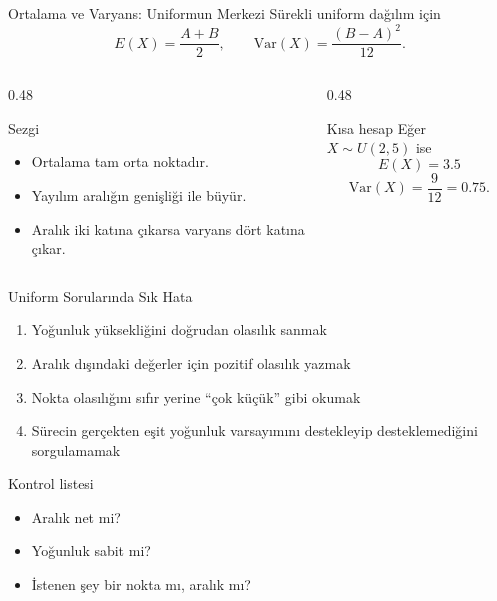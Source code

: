 \documentclass[light]{lutbeamer}
\begin{document}
\begin{frame}{Ortalama ve Varyans: Uniformun Merkezi}
    \small
    Sürekli uniform dağılım için
    \[
    E(X)=\frac{A+B}{2}, \qquad \mathrm{Var}(X)=\frac{(B-A)^2}{12}.
    \]

    \begin{columns}[T]
        \begin{column}{0.48\textwidth}
            \begin{block}{Sezgi}
                \begin{itemize}
                    \item Ortalama tam orta noktadır.
                    \item Yayılım aralığın genişliği ile büyür.
                    \item Aralık iki katına çıkarsa varyans dört katına çıkar.
                \end{itemize}
            \end{block}
        \end{column}
        \begin{column}{0.48\textwidth}
            \begin{exampleblock}{Kısa hesap}
                Eğer \(X \sim U(2,5)\) ise
                \[
                E(X)=3.5
                \]
                \[
                \mathrm{Var}(X)=\frac{9}{12}=0.75.
                \]
            \end{exampleblock}
        \end{column}
    \end{columns}
\end{frame}

\begin{frame}{Uniform Sorularında Sık Hata}
    \small
    \begin{enumerate}
        \item Yoğunluk yüksekliğini doğrudan olasılık sanmak
        \item Aralık dışındaki değerler için pozitif olasılık yazmak
        \item Nokta olasılığını sıfır yerine ``çok küçük'' gibi okumak
        \item Sürecin gerçekten eşit yoğunluk varsayımını destekleyip desteklemediğini sorgulamamak
    \end{enumerate}

    \begin{alertblock}{Kontrol listesi}
        \begin{itemize}
            \item Aralık net mi?
            \item Yoğunluk sabit mi?
            \item İstenen şey bir nokta mı, aralık mı?
        \end{itemize}
    \end{alertblock}
\end{frame}
\end{document}
